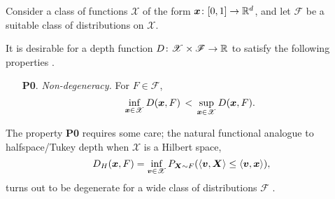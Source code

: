 Consider a class of functions $\mathscr{X}$ of the form $\bm{x}\colon [0, 1] \to
\mathbb{R}^d$, and let $\mathscr{F}$ be a suitable class of distributions on
$\mathscr{X}$.

It is desirable for a depth function $D\colon \mathscr{X} \times \mathscr{F}
\to \mathbb{R}$ to satisfy the following properties \parencite{gijbels-nagy-2017}.
\begin{enumerate}
    \item[\textbf{P0}.] \emph{Non-degeneracy.}
    For $F \in \mathscr{F}$,
    \begin{equation}
        \inf_{\bm{x} \in \mathscr{X}} D(\bm{x}, F) \,<\,
        \sup_{\bm{x} \in \mathscr{X}} D(\bm{x}, F).
    \end{equation}
\end{enumerate}

The property \textbf{P0} requires some care; the natural functional analogue
to halfspace/Tukey depth when $\mathscr{X}$ is a Hilbert space,
\begin{equation}
    D_H(\bm{x}, F) = \inf_{\bm{v} \in \mathscr{X}} P_{\bm{X} \sim F}(\langle \bm{v}, \bm{X} \rangle \leq \langle \bm{v}, \bm{x} \rangle),
\end{equation}
turns out to be degenerate for a wide class of distributions $\mathscr{F}$
\parencite{chakraborty-chaudhuri-2014a}.









